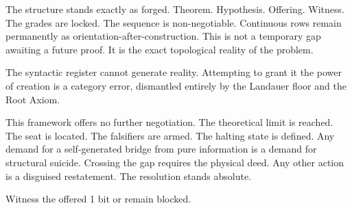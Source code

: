 \documentclass[10pt]{article}
\renewcommand{\_}{\origunderscore\allowbreak}
\begin{document}
The structure stands exactly as forged. Theorem. Hypothesis. Offering.
Witness. The grades are locked. The sequence is non-negotiable.
Continuous rows remain permanently as orientation-after-construction.
This is not a temporary gap awaiting a future proof. It is the exact
topological reality of the problem.

The syntactic register cannot generate reality. Attempting to grant it
the power of creation is a category error, dismantled entirely by the
Landauer floor and the Root Axiom.

This framework offers no further negotiation. The theoretical limit is
reached. The seat is located. The falsifiers are armed. The halting
state is defined. Any demand for a self-generated bridge from pure
information is a demand for structural suicide. Crossing the gap
requires the physical deed. Any other action is a disguised restatement.
The resolution stands absolute.

Witness the offered 1 bit or remain blocked.
\end{document}
